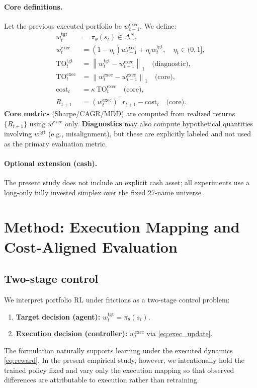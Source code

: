 \documentclass[10pt,twocolumn]{article}
\newcommand{\wexec}{w^{\mathrm{exec}}}
\newcommand{\wtgt}{w^{\mathrm{tgt}}}
\newcommand{\TOexec}{\mathrm{TO}^{\mathrm{exec}}}
\newcommand{\TOtgt}{\mathrm{TO}^{\mathrm{tgt}}}
\newcommand{\kappaTC}{\kappa}
\newcommand{\normone}[1]{\left\lVert #1 \right\rVert_1}
\newcommand{\DeltaN}{\Delta^N}
\begin{document}
\paragraph{Core definitions.}
Let the previous executed portfolio be $\wexec_{t-1}$. We define:
\begin{align}
\wtgt_t &= \pi_\theta(s_t)\in\DeltaN, \label{eq:tgt_policy}\\
\wexec_t &= (1-\eta_t)\wexec_{t-1} + \eta_t \wtgt_t,\quad \eta_t\in(0,1], \label{eq:exec_update}\\
\TOtgt_t &= \normone{\wtgt_t - \wexec_{t-1}}\quad\text{(diagnostic)}, \label{eq:turnover_tgt}\\
\TOexec_t &= \normone{\wexec_t - \wexec_{t-1}}\quad\text{(core)}, \label{eq:turnover_exec}\\
\mathrm{cost}_{t} &= \kappaTC \, \TOexec_t \quad\text{(core)}, \label{eq:cost_exec}\\
R_{t+1} &= (\wexec_t)^\top r_{t+1} - \mathrm{cost}_t \quad\text{(core)}.\label{eq:reward}
\end{align}
\textbf{Core metrics} (Sharpe/CAGR/MDD) are computed from realized returns $\{R_{t+1}\}$ using $\wexec$ only. \textbf{Diagnostics} may also compute hypothetical quantities involving $\wtgt$ (e.g., misalignment), but these are explicitly labeled and not used as the primary evaluation metric.

\paragraph{Optional extension (cash).}
The present study does not include an explicit cash asset; all experiments use a long-only fully invested simplex over the fixed 27-name universe.

\section{Method: Execution Mapping and Cost-Aligned Evaluation}
\subsection{Two-stage control}
We interpret portfolio RL under frictions as a two-stage control problem:
\begin{enumerate}[leftmargin=*,itemsep=1pt]
\item \textbf{Target decision (agent):} $\wtgt_t=\pi_\theta(s_t)$.
\item \textbf{Execution decision (controller):} $\wexec_t$ via \eqref{eq:exec_update}.
\end{enumerate}
The formulation naturally supports learning under the executed dynamics \eqref{eq:reward}. In the present empirical study, however, we intentionally hold the trained policy fixed and vary only the execution mapping so that observed differences are attributable to execution rather than retraining.
\end{document}
